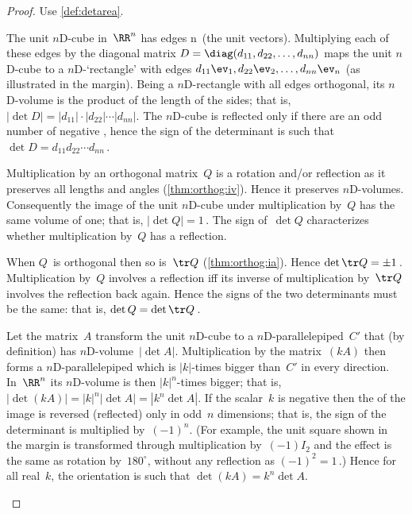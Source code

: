 \begin{proof} Use \cref{def:detarea}.
\begin{description}
\item[\ref{thm:basicdet:i}]
The unit $n$D-cube in~\(\RR^n\) has edges \hlist\ev n\ (the unit vectors).
Multiplying each of these edges by the diagonal matrix \(D=\diag(d_{11},d_{22},\ldots,d_{nn})\) maps the unit $n$D-cube to a $n$D-`rectangle' with edges \(d_{11}\ev_1,d_{22}\ev_2,\ldots,d_{nn}\ev_n\) (as illustrated in the margin).
Being a $n$D-rectangle with all edges orthogonal, its $n$D-volume is the product of the length of the sides; that is, \(|\det D|=|d_{11}|\cdot|d_{22}|\cdots |d_{nn}|\).
The $n$D-cube is reflected only if there are an odd number of negative , hence the sign of the determinant is such that \(\det D=d_{11}d_{22}\cdots d_{nn}\)\,.

\item[\ref{thm:basicdet:ii}]
Multiplication by an orthogonal matrix~\(Q\) is a rotation and/or reflection as it preserves all lengths and angles (\cref{thm:orthog:iv}).
Hence it preserves $n$D-volumes.
Consequently the image of the unit $n$D-cube under multiplication by~\(Q\) has the same volume of one; that is, \(|\det Q|=1\)\,.
The sign of~\(\det Q\) characterizes whether multiplication by~\(Q\) has a reflection.

When \(Q\)~is orthogonal then so is~\(\tr Q\) (\cref{thm:orthog:ia}).  Hence \(\det\tr Q=\pm1\)\,.
Multiplication by~\(Q\) involves a reflection iff its inverse of multiplication by~\(\tr Q\) involves the reflection back again.
Hence the signs of the two determinants must be the same: that is, \(\det Q=\det\tr Q\)\,.

\item[\ref{thm:basicdet:iii}]
Let the matrix~\(A\) transform the unit $n$D-cube to a $n$D-parallelepiped~\(C'\) that  (by definition) has $n$D-volume~\(|\det A|\).
Multiplication by the matrix~\((kA)\) then forms a $n$D-parallelepiped which is \(|k|\)-times bigger than~\(C'\) in every direction.
In~\(\RR^n\) its $n$D-volume is then \(|k|^n\)-times bigger; that is,
\(|\det(kA)|=|k|^n|\det A|=|k^n\det A|\).
If the scalar~\(k\) is negative then the  of the image is reversed (reflected) only in odd~\(n\) dimensions; that is, the sign of the determinant is multiplied by~\((-1)^n\).
%
(For example, the unit square shown in the margin is transformed through multiplication by~\((-1)I_2\) and the effect is the same as rotation by~\(180^\circ\), without any reflection as \((-1)^2=1\)\,.)
Hence for all real~\(k\), the orientation is such that \(\det(kA)=k^n\det A\). 
\end{description}
\end{proof}




